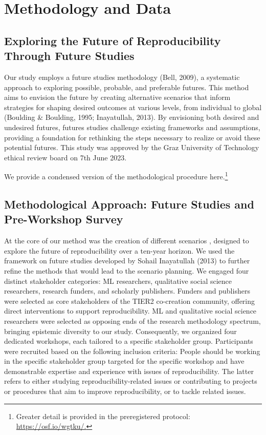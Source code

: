\documentclass[authordate, meta]{jote-new-article}
\begin{document}
	\section{Methodology and Data}



	\subsection{Exploring the Future of Reproducibility Through Future Studies}



	Our study employs a future studies methodology (Bell, 2009), a systematic approach to exploring possible, probable, and preferable futures. This method aims to envision the future by creating alternative scenarios that inform strategies for shaping desired outcomes at various levels, from individual to global (Boulding \& Boulding, 1995; Inayatullah, 2013). By envisioning both desired and undesired futures, futures studies challenge existing frameworks and assumptions, providing a foundation for rethinking the steps necessary to realize or avoid these potential futures. This study was approved by the Graz University of Technology ethical review board on 7th June 2023.



	We provide a condensed version of the methodological procedure here.\footnote{Greater detail is provided in the preregistered protocol: \url{https://osf.io/wgtku/.}}



	\subsection{Methodological Approach: Future Studies and Pre-Workshop Survey}



	At the core of our method was the creation of different scenarios , designed to explore the future of reproducibility over a ten-year horizon. We used the framework on future studies developed by Sohail Inayatullah (2013) to further refine the methods that would lead to the scenario planning. We engaged four distinct stakeholder categories: ML researchers, qualitative social science researchers, research funders, and scholarly publishers. Funders and publishers were selected as core stakeholders of the TIER2 co-creation community, offering direct interventions to support reproducibility. ML and qualitative social science researchers were selected as opposing ends of the research methodology spectrum, bringing epistemic diversity to our study. Consequently, we organized four dedicated workshops, each tailored to a specific stakeholder group. Participants were recruited based on the following inclusion criteria: People should be working in the specific stakeholder group targeted for the specific workshop and have demonstrable expertise and experience with issues of reproducibility. The latter refers to either studying reproducibility-related issues or contributing to projects or procedures that aim to improve reproducibility, or to tackle related issues.
\end{document}
